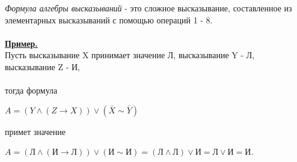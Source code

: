 \documentclass{article}
\begin{document}
	\textit{Формула алгебры высказываний} - это сложное высказывание, составленное из
	элементарных высказываний с помощью операций 1 - 8.
	\\\\
	\underline{\textbf{Пример.}}\\
	Пусть высказывание X принимает значение Л,
	высказывание Y - Л,\\
	высказывание Z - И,
	\\\\
	тогда формула
	\begin{center}
		$A = (Y \wedge (Z \rightarrow X)) \vee (\bar{X} \sim \bar{Y})$
	\end{center}
	примет значение
	\begin{center}
		$A = (Л \wedge (И \rightarrow Л)) \vee (И \sim И) = (Л \wedge Л) \vee И = Л \vee И = И$.
	\end{center}
	
\end{document}
